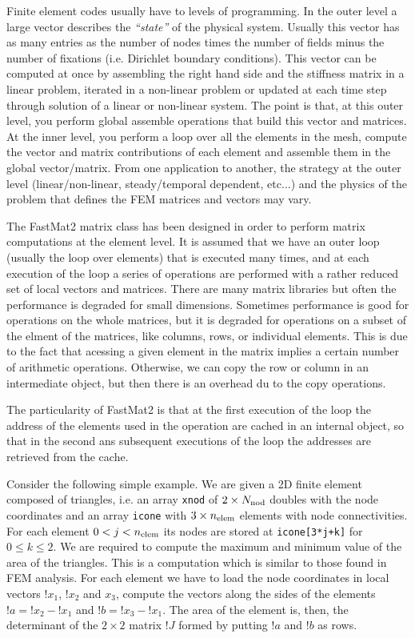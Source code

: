 

Finite element codes usually have to levels of programming.
In the outer level a large vector describes the \emph{``state''} of
the physical system. Usually this vector has as many entries as the
number of nodes times the number of fields minus the number of
fixations (i.e. Dirichlet boundary conditions). This vector can be
computed at once by assembling the right hand side and the stiffness
matrix in a linear problem, iterated in a non-linear problem or
updated at each time step through solution of a linear or non-linear
system. The point is that, at this outer level, you perform global
assemble operations that build this vector and matrices. At the inner
level, you perform a loop over all the elements in the mesh, compute
the vector and matrix contributions of each element and assemble them
in the global vector/matrix. From one application to another, the
strategy at the outer level (linear/non-linear, steady/temporal
dependent, etc...) and the physics of the problem that defines the
FEM matrices and vectors may vary. 

The FastMat2 matrix class has been designed in order to perform matrix
computations at the element level. It is assumed that we have an outer
loop (usually the loop over elements) that is executed many times, and
at each execution of the loop a series of operations are performed
with a rather reduced set of local vectors and matrices. There are
many matrix libraries but often the performance is degraded for small
dimensions. Sometimes performance is good for operations on the whole
matrices, but it is degraded for operations on a subset of the elment
of the matrices, like columns, rows, or individual elements. 
This is due to the fact that acessing a given element in the matrix
implies a certain number of arithmetic operations. Otherwise, we can
copy the row or column in an intermediate object, but then there is an
overhead du to the copy operations. 

The particularity of FastMat2 is that at the first execution of the
loop the address of the elements used in the operation are cached in
an internal object, so that in the second ans subsequent executions of
the loop the addresses are retrieved from the cache. 

\label{sec:fastmat2_example}  

Consider the following simple example. We are given a 2D finite
element composed of triangles, i.e. an array \verb+xnod+ of
$2\times{N_{\mathrm{nod}}}$ doubles with the node coordinates and an array
\verb+icone+ with $3\times{n_\mathrm{elem}}$ elements with node
connectivities. For each element $0<j<{n_\mathrm{elem}}$ its nodes are stored at
\verb|icone[3*j+k]| for $0\le k\le 2$. We are required to compute the
maximum and minimum value of the area of the triangles. This is a
computation which is similar to those found in FEM analysis. 
For each element we have to load the node coordinates in local vectors
$!x_1$, $!x_2$ and $x_3$, compute the vectors along the sides of the
elements $!a=!x_2-!x_1$ and $!b=!x_3-!x_1$. The area of the element
is, then, the determinant of the $2\times 2$ matrix $!J$ formed by
putting $!a$ and $!b$ as rows.


